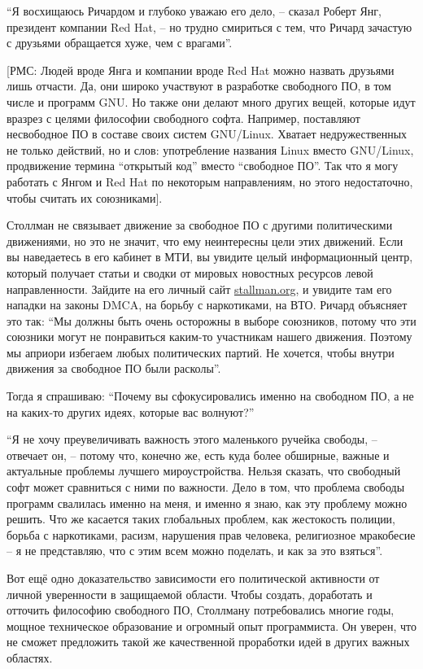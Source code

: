 \enquote{Я восхищаюсь Ричардом и глубоко уважаю его дело, -- сказал Роберт Янг, президент компании Red Hat, -- но трудно смириться с тем, что Ричард зачастую с друзьями обращается хуже, чем с врагами}.

[РМС: Людей вроде Янга и компании вроде Red Hat можно назвать друзьями лишь отчасти. Да, они широко участвуют в разработке свободного ПО, в том числе и программ GNU. Но также они делают много других вещей, которые идут вразрез с целями философии свободного софта. Например, поставляют несвободное ПО в составе своих систем GNU/Linux. Хватает недружественных не только действий, но и слов: употребление названия Linux вместо GNU/Linux, продвижение термина \enquote{открытый код} вместо \enquote{свободное ПО}. Так что я могу работать с Янгом и Red Hat по некоторым направлениям, но этого недостаточно, чтобы считать их союзниками].

Столлман не связывает движение за свободное ПО с другими политическими движениями, но это не значит, что ему неинтересны цели этих движений. Если вы наведаетесь в его кабинет в МТИ, вы увидите целый информационный центр, который получает статьи и сводки от мировых новостных ресурсов левой направленности. Зайдите на его личный сайт \url{stallman.org}, и увидите там его нападки на законы DMCA, на борьбу с наркотиками, на ВТО. Ричард объясняет это так: \enquote{Мы должны быть очень осторожны в выборе союзников, потому что эти союзники могут не понравиться каким-то участникам нашего движения. Поэтому мы априори избегаем любых политических партий. Не хочется, чтобы внутри движения за свободное ПО были расколы}.

Тогда я спрашиваю: \enquote{Почему вы сфокусировались именно на свободном ПО, а не на каких-то других идеях, которые вас волнуют?}

\enquote{Я не хочу преувеличивать важность этого маленького ручейка свободы, -- отвечает он, -- потому что, конечно же, есть куда более обширные, важные и актуальные проблемы лучшего мироустройства. Нельзя сказать, что свободный софт может сравниться с ними по важности. Дело в том, что проблема свободы программ свалилась именно на меня, и именно я знаю, как эту проблему можно решить. Что же касается таких глобальных проблем, как жестокость полиции, борьба с наркотиками, расизм, нарушения прав человека, религиозное мракобесие -- я не представляю, что с этим всем можно поделать, и как за это взяться}.

Вот ещё одно доказательство зависимости его политической активности от личной уверенности в защищаемой области. Чтобы создать, доработать и отточить философию свободного ПО, Столлману потребовались многие годы, мощное техническое образование и огромный опыт программиста. Он уверен, что не сможет предложить такой же качественной проработки идей в других важных областях.

